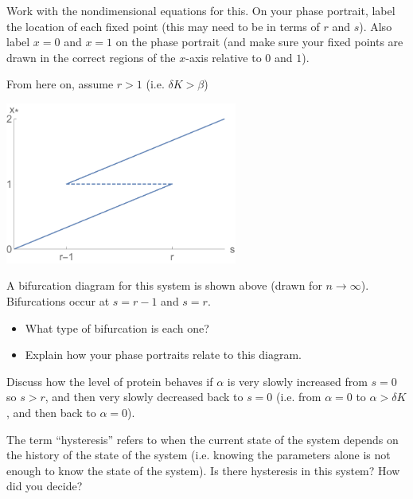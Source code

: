 \documentclass[12pt,letterpaper]{exam}
\begin{document}
\begin{questions}
\begin{parts}
Work with the nondimensional equations for this.  On your phase portrait, label the location of each fixed point (this may need to be in terms of $r$ and $s$).  Also label $x =0$ and $x=1$ on the phase portrait (and make sure your fixed points are drawn in the correct regions of the $x$-axis relative to $0$ and $1$).
\end{parts}

From here on, assume $r > 1$ (i.e. $\delta K > \beta$)

\includegraphics[width=3in]{img/HW03_377_p3.pdf}

\begin{parts}
\setcounter{partno}{2}

\item  A bifurcation diagram for this system is shown above (drawn for $n\rightarrow\infty$).  Bifurcations occur at $s = r-1$ and $s = r$.  
\begin{itemize}
    \item What type of bifurcation is each one?
    \item Explain how your phase portraits relate to this diagram.
\end{itemize}
 
\begin{solution}
\end{solution}
\item Discuss how the level of protein behaves if $\alpha$ is very slowly increased from $s=0$ so $s>r$, and then very slowly decreased back to $s = 0$ (i.e. from $\alpha = 0$ to $\alpha>\delta K$, and then back to $\alpha = 0$).

The term ``hysteresis'' refers to when the current state of the system depends on the history of the state of the system (i.e. knowing the parameters alone is not enough to know the state of the system).  Is there hysteresis in this system?  How did you decide?
\begin{solution}
\end{solution}
\end{parts}



\end{questions}
\end{document}
